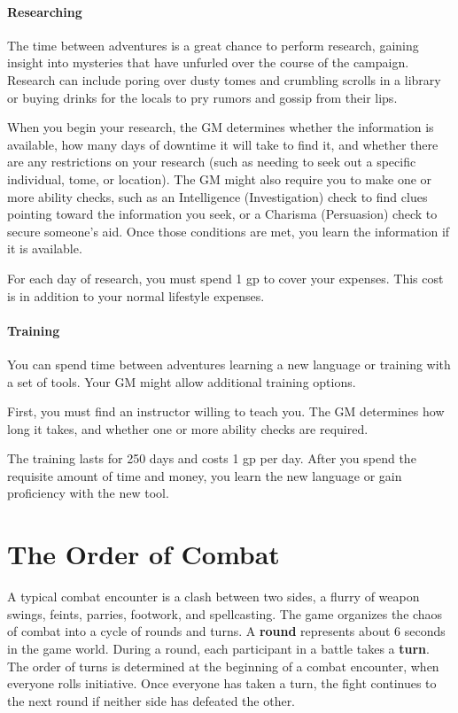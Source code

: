 \subsubsection{Researching}

The time between adventures is a great chance to perform research, gaining insight into mysteries that have unfurled over the course of the campaign. Research can include poring over dusty tomes and crumbling scrolls in a library or buying drinks for the locals to pry rumors and gossip from their lips.

When you begin your research, the GM determines whether the information is available, how many days of downtime it will take to find it, and whether there are any restrictions on your research (such as needing to seek out a specific individual, tome, or location). The GM might also require you to make one or more ability checks, such as an Intelligence (Investigation) check to find clues pointing toward the information you seek, or a Charisma (Persuasion) check to secure someone's aid. Once those conditions are met, you learn the information if it is available.

For each day of research, you must spend 1 gp to cover your expenses. This cost is in addition to your normal lifestyle expenses.

\subsubsection{Training}

You can spend time between adventures learning a new language or training with a set of tools. Your GM might allow additional training options.

First, you must find an instructor willing to teach you. The GM determines how long it takes, and whether one or more ability checks are required.

The training lasts for 250 days and costs 1 gp per day. After you spend the requisite amount of time and money, you learn the new language or gain proficiency with the new tool.

\chapter{The Order of Combat}
A typical combat encounter is a clash between two sides, a flurry of weapon swings, feints, parries, footwork, and spellcasting. The game organizes the chaos of combat into a cycle of rounds and turns. A
\textbf{round} represents about 6 seconds in the game world. During a round, each participant in a battle takes a \textbf{turn}. The order of turns is determined at the beginning of a combat encounter, when everyone rolls initiative. Once everyone has taken a turn, the fight continues to the next round if neither side has defeated the other.

